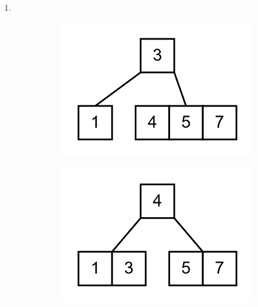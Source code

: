 \documentclass[11pt,a4paper]{article}
\begin{document}
\begin{loesung}
\begin{enumerate}
        \item \ \\
        \begin{figure}[h!]
            \centering
            \begin{subfigure}[b]{0.20\textwidth}
                \centering
                \includegraphics[width=\textwidth]{img/3b/1}
            \end{subfigure}
            \begin{subfigure}[b]{0.20\textwidth}
                \centering
                \includegraphics[width=\textwidth]{img/3b/2}
            \end{subfigure}
            \begin{subfigure}[b]{0.20\textwidth}
                \centering

\end{subfigure}
\end{figure}
\end{enumerate}
\end{loesung}
\end{document}
